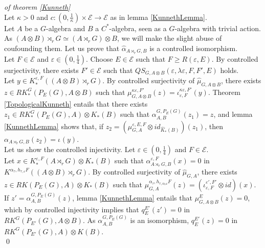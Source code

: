 \begin{dem} \textit{of theorem \ref{Kunneth}}\\
Let $\kappa>0$ and $c : (0,\frac{1}{\kappa})\times\mathcal E\rightarrow \mathcal E$ as in lemma \ref{KunnethLemma}.\\

Let $A$ be a $G$-algebra and $B$ a $C^*$-algebra, seen as a $G$-algebra with trivial action. As $(A\otimes B)\rtimes_r G \simeq (A\rtimes_r G)\otimes B$, we will make the slight abuse of coufounding them. Let us prove that $\hat \alpha_{A\rtimes_r G,B}$ is a controlled isomorphism.\\

Let $F\in\mathcal E$ and $\varepsilon\in (0,\frac{1}{4})$. Choose $E \in\mathcal E$ such that $F\geq R(\varepsilon,E)$. By controlled surjectivity, there exists $F'\in \mathcal E$ such that $QS_{G,A\otimes B}(\varepsilon,\lambda\varepsilon, F,F',E)$ holds.\\

Let $y\in K^{\varepsilon,F}_*((A\otimes B)\rtimes_r G)$. By controlled surjectivity of $\hat\mu_{G,A\otimes B}$, there exists $z\in RK_*^G(P_E(G), A\otimes B) $ such that $\mu_{G,A\otimes B}^{\kappa\varepsilon,F'}(z)=\iota_{\varepsilon,F}^{\kappa\varepsilon,F'}(y)$. Theorem \ref{TopologicalKunneth} entails that there exists $z_1 \in RK_*^G(P_E(G),A)\otimes K_*(B) $ such that $\alpha_{A,B}^{G,P_E(G)}(z_1)=z$, and lemma \ref{KunnethLemma} shows that, if $z_2=(\mu_{G,A}^{\varepsilon,E,F} \otimes id_{\hat K_*(B)})(z_1)$, then $\alpha_{A\rtimes_r G,B}(z_2)=\iota_{}^{}(y)$.\\

Let us show the controlled injectivity. Let $\varepsilon\in(0,\frac{1}{4})$ and $F\in\mathcal E$.\\ 

Let $x\in K^{\varepsilon,F}_*(A\rtimes_r G)\otimes K_*(B)$ such that $\alpha_{A\rtimes_r G,B}^{\varepsilon,F}(x)=0$ in $K^{\alpha_\tau,h_{\tau,\varepsilon} F}((A\otimes B)\rtimes_r G)$. By controlled surjectivity of $\hat\mu_{G,A}$, there exists $z\in RK(P_E(G),A)\otimes K_*(B)$ such that $\mu_{G,A}^{\alpha_\tau,h_{\tau,\alpha_\tau\varepsilon} F}(z)=(\iota_{\varepsilon,F}^{\varepsilon',F'}\otimes id) (x)$. If $z' = \alpha_{A,B}^{G,P_E(G)}(z)$, lemma \ref{KunnethLemma} entails that $\mu^{E}_{G,A\otimes B}(z)=0$, which by controlled injectivity implies that $q_E^{E'}(z')=0$ in $RK^G(P_{E'}(G),A\otimes B)$. As $\alpha_{A,B}^{G,P_E(G)}$ is an isomorphism, $q_E^{E'}(z)=0$ in $RK^G(P_{E'}(G),A)\otimes K(B)$.\\
\qed
\end{dem}




























